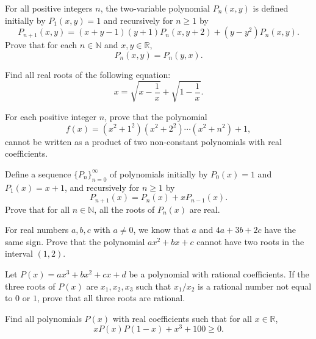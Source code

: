 \documentclass[12pt,a4paper]{memoir}
\theoremstyle{definition}
\begin{document}
\begin{question}[name={1998 Bulgaria}]
	For all positive integers $n$, the two-variable polynomial $P_n(x,y)$ is defined initially by $P_1(x,y)=1$ and recursively for $n\geq 1$ by
	\[P_{n+1}(x,y) = (x+y-1)(y+1)P_n(x,y+2) + (y-y^2)P_n(x,y).\]
	Prove that for each $n\in\mathbb N$ and $x,y \in \mathbb R$,
	\[P_n(x,y) = P_n(y,x).\]
\end{question}



\begin{question}[name={1998 Canada}]
	Find all real roots of the following equation:
	\[x = \sqrt{x-\frac{1}{x}}+\sqrt{1-\frac{1}{x}}.\]
\end{question}

\begin{question}[name={1999 Japan}]
	For each positive integer $n$, prove that the polynomial
	\[f(x)=(x^2+1^2)(x^2+2^2)\cdots (x^2+n^2) + 1,\]
	cannot be written as a product of two non-constant polynomials with real coefficients.
\end{question}

\begin{question}
	Define a sequence $\{P_n\}_{n=0}^\infty$ of polynomials initially by $P_0(x)=1$ and $P_1(x)=x+1$, and recursively for $n \geq 1$ by
	\[P_{n+1}(x) = P_n(x) + xP_{n-1}(x).\]
	Prove that for all $n\in \mathbb N$, all the roots of $P_n(x)$ are real.
\end{question}



\begin{question}[name={1996 Romania}]
	For real numbers $a,b,c$ with $a\neq 0$, we know that $a$ and $4a+3b+2c$ have the same sign. Prove that the polynomial $ax^2+bx+c$ cannot have two roots in the interval $(1,2)$.
\end{question}



\begin{question}[name={1997 Iran}]
	Let $P(x)=ax^3+bx^2+cx+d$ be a polynomial with rational coefficients. If the three roots of $P(x)$ are $x_1,x_2,x_3$ such that $x_1/x_2$ is a rational number not equal to $0$ or $1$, prove that all three roots are rational.
\end{question}


\begin{question}[name={1997 Iran}]
	Find all polynomials $P(x)$ with real coefficients such that for all $x \in \mathbb R$,
	\[xP(x)P(1-x) + x^3 + 100 \geq 0.\]
\end{question}
\end{document}
